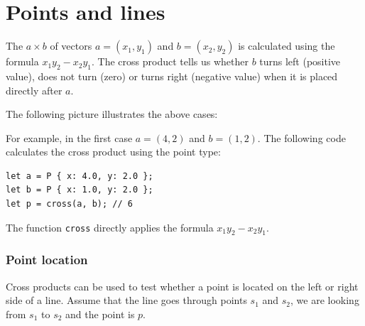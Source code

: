 \section{Points and lines}


The  $a \times b$ of vectors
$a=(x_1,y_1)$ and $b=(x_2,y_2)$ is calculated
using the formula $x_1 y_2 - x_2 y_1$.
The cross product tells us whether $b$
turns left (positive value), does not turn (zero)
or turns right (negative value)
when it is placed directly after $a$.

The following picture illustrates the above cases:
\begin{center}
\end{center}

\noindent
For example, in the first case
$a=(4,2)$ and $b=(1,2)$.
The following code calculates the cross product
using the point type:

\begin{lstlisting}
let a = P { x: 4.0, y: 2.0 };
let b = P { x: 1.0, y: 2.0 };
let p = cross(a, b); // 6
\end{lstlisting}

The function \texttt{cross} directly
applies the formula $x_1 y_2 - x_2 y_1$.

\subsubsection{Point location}

Cross products can be used to test
whether a point is located on the left or right
side of a line.
Assume that the line goes through points
$s_1$ and $s_2$, we are looking from $s_1$
to $s_2$ and the point is $p$.

